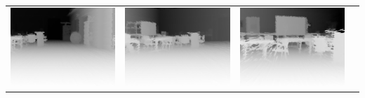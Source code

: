 \documentclass[english, bachelor, utf8]{base/thesis_telematics}
\begin{document}
\begin{table}[h]
\begin{tabular}{
  >{\centering\arraybackslash}m{}
  >{\centering\arraybackslash}m{}
  >{\centering\arraybackslash}m{}
  >{\centering\arraybackslash}m{}
}
    \includegraphics[width=\linewidth]{pics/robo/robo_1/depth0016.png} &
    \includegraphics[width=\linewidth]{pics/robo/robo_2/depth0016.png} &
    \includegraphics[width=\linewidth]{pics/robo/robo_3/depth0016.png} &

\end{tabular}
\end{table}
\end{document}
